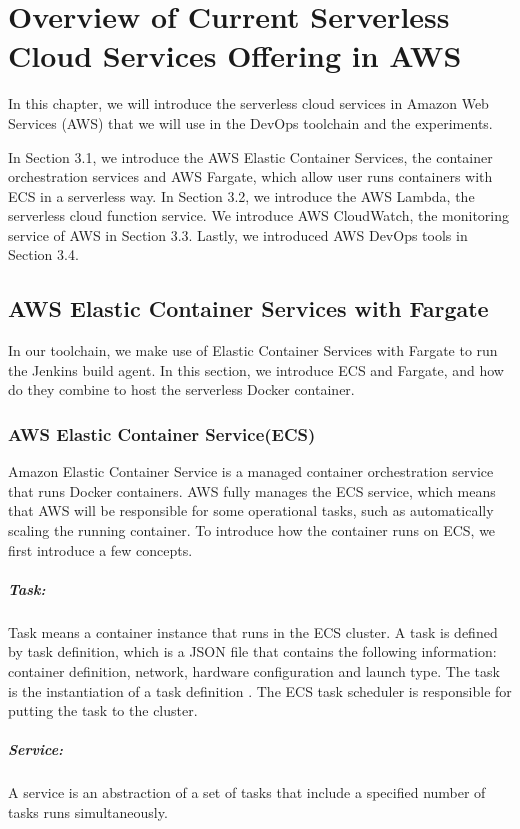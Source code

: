 \chapter{Overview of Current Serverless Cloud Services Offering in AWS}
In this chapter, we will introduce the serverless cloud services in Amazon Web Services (AWS) that we will use in the DevOps toolchain and the experiments.
\par
In Section 3.1, we introduce the AWS Elastic Container Services, the container orchestration services and AWS Fargate, which allow user runs containers with ECS in a serverless way. In Section 3.2, we introduce the AWS Lambda, the serverless cloud function service. We introduce AWS CloudWatch, the monitoring service of AWS in Section 3.3. Lastly, we introduced AWS DevOps tools in Section 3.4.
\section{AWS Elastic Container Services with Fargate}
In our toolchain, we make use of Elastic Container Services with Fargate to run the Jenkins build agent. In this section, we introduce ECS and Fargate, and how do they combine to host the serverless Docker container.
\subsection{AWS Elastic Container Service(ECS)}
Amazon Elastic Container Service is a managed container orchestration service that runs Docker containers. AWS fully manages the ECS service, which means that AWS will be responsible for some operational tasks, such as automatically scaling the running container. To introduce how the container runs on ECS, we first introduce a few concepts.
\paragraph{Task:} Task means a container instance that runs in the ECS cluster. A task is defined by task definition, which is a JSON file that contains the following information: container definition, network, hardware configuration and launch type. The task is the instantiation of a task definition \cite{WhatisAm71:online}. The ECS task scheduler is responsible for putting the task to the cluster. 
\paragraph{Service:} A service is an abstraction of a set of tasks that include a specified number of tasks runs simultaneously.
